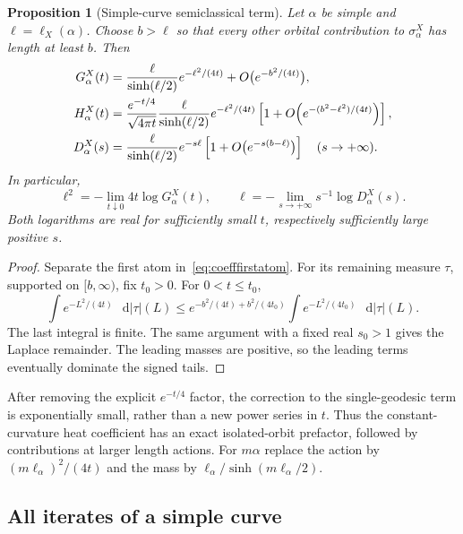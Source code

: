 \documentclass[11pt,a4paper]{article}
\numberwithin{equation}{section}
\newtheorem{proposition}[theorem]{Proposition}
\theoremstyle{definition}
\theoremstyle{remark}
\newcommand{\dd}{\mathop{}\!\mathrm d}
\begin{document}
\begin{proposition}[Simple-curve semiclassical term]
\label{prop:coeffheatfirst}
Let $\alpha$ be simple and $\ell=\ell_X(\alpha)$. Choose
$b>\ell$ so that every other orbital contribution to
$\sigma_\alpha^X$ has length at least $b$. Then
\begin{align}
 G_\alpha^X(t)
 &=\frac{\ell}{\sinh(\ell/2)}e^{-\ell^2/(4t)}
   +O\bigl(e^{-b^2/(4t)}\bigr),\notag\\
 H_\alpha^X(t)
 &=\frac{e^{-t/4}}{\sqrt{4\pi t}}
   \frac{\ell}{\sinh(\ell/2)}e^{-\ell^2/(4t)}
   \left[1+O\!\left(e^{-(b^2-\ell^2)/(4t)}\right)\right],
 \label{eq:coeffheatfirst}\\
 D_\alpha^X(s)
 &=\frac{\ell}{\sinh(\ell/2)}e^{-s\ell}
   \left[1+O\bigl(e^{-s(b-\ell)}\bigr)\right]
   \quad(s\to+\infty).
 \label{eq:coeffLaplacefirst}
\end{align}
In particular,
\begin{equation}
 \boxed{
 \ell^2=-\lim_{t\downarrow0}4t\log G_\alpha^X(t),\qquad
 \ell=-\lim_{s\to+\infty}s^{-1}\log D_\alpha^X(s).
 }
 \label{eq:coefflengthlimits}
\end{equation}
Both logarithms are real for sufficiently small $t$, respectively
sufficiently large positive $s$.
\end{proposition}

\begin{proof}
Separate the first atom in~\eqref{eq:coefffirstatom}. For its
remaining measure $\tau$, supported on $[b,\infty)$, fix $t_0>0$.
For $0<t\leq t_0$,
\[
 \int e^{-L^2/(4t)}\,\dd|\tau|(L)
 \leq e^{-b^2/(4t)+b^2/(4t_0)}
       \int e^{-L^2/(4t_0)}\,\dd|\tau|(L).
\]
The last integral is finite. The same argument with a fixed real
$s_0>1$ gives the Laplace remainder. The leading masses are
positive, so the leading terms eventually dominate the signed tails.
\end{proof}

After removing the explicit $e^{-t/4}$ factor, the correction to
the single-geodesic term is exponentially small, rather than a new
power series in $t$. Thus the constant-curvature heat coefficient
has an exact isolated-orbit prefactor, followed by contributions at
larger length actions. For $m\alpha$ replace the action by
$(m\ell_\alpha)^2/(4t)$ and the mass by
$\ell_\alpha/\sinh(m\ell_\alpha/2)$.

\subsection{All iterates of a simple curve}
\end{document}
